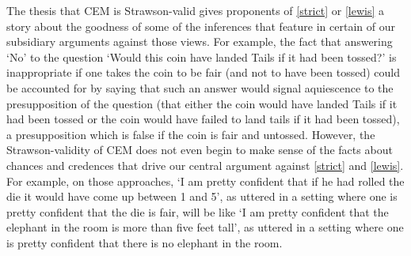 \documentclass[If.tex]{subfiles}
\begin{document}
The thesis that CEM is Strawson-valid gives proponents of \ref{strict} or \ref{lewis} a story about the goodness of some of the inferences that feature in certain of our subsidiary arguments against those views.  For example, the fact that answering ‘No’ to the question ‘Would this coin have landed Tails if it had been tossed?’ is inappropriate if one takes the coin to be fair (and not to have been tossed) could be accounted for by saying that such an answer would signal aquiescence to the presupposition of the question (that either the coin would have landed Tails if it had been tossed or the coin would have failed to land tails if it had been tossed), a presupposition which is false if the coin is fair and untossed.  However, the Strawson-validity of CEM does not even begin to make sense of the facts about chances and credences that drive our central argument against \ref{strict} and \ref{lewis}.  For example, on those approaches, ‘I am pretty confident that if he had rolled the die it would have come up between 1 and 5’, as uttered in a setting where one is pretty confident that the die is fair, will be like ‘I am pretty confident that the elephant in the room is more than five feet tall’, as uttered in a setting where one is pretty confident that there is no elephant in the room.  
\end{document}
